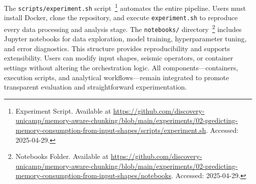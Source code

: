 The \texttt{scripts/experiment.sh} script~\footnote{Experiment Script. Available at \url{https://github.com/discovery-unicamp/memory-aware-chunking/blob/main/experiments/02-predicting-memory-consumption-from-input-shapes/scripts/experiment.sh}. Accessed: 2025-04-29.} automates the entire pipeline.
Users must install Docker, clone the repository, and execute \texttt{experiment.sh} to reproduce every data processing and analysis stage.
The \texttt{notebooks/} directory~\footnote{Notebooks Folder. Available at \url{https://github.com/discovery-unicamp/memory-aware-chunking/blob/main/experiments/02-predicting-memory-consumption-from-input-shapes/notebooks}. Accessed: 2025-04-29.} includes Jupyter notebooks for data exploration, model training, hyperparameter tuning, and error diagnostics.
This structure provides reproducibility and supports extensibility.
Users can modify input shapes, seismic operators, or container settings without altering the orchestration logic.
All components—containers, execution scripts, and analytical workflows—remain integrated to promote transparent evaluation and straightforward experimentation.